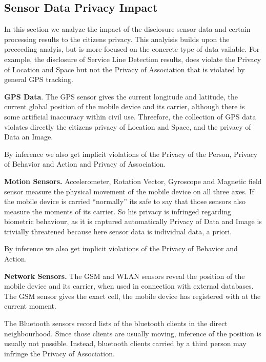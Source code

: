 \subsection{Sensor Data Privacy Impact}\label{sec:SensorPrivacyImpact}



In this section we analyze the impact of the disclosure sensor data and certain processing results to the citizens privacy.
This analyisis builds upon the preceeding analyis, but is more focused on the concrete type of data vailable.
For example, the disclosure of Service Line Detection results, does violate the Privacy of Location and Space but not the Privacy of Association that is violated by general GPS tracking.

\textbf{GPS Data}.
The GPS sensor gives the current longitude and latitude, the current global position of the mobile device and its carrier, although there is some artificial inaccuracy within civil use. Threefore, the collection of GPS data violates directly the citizens privacy of Location and Space, and the privacy of Data an Image.

By inference we also get implicit violations of the Privacy of the Person, Privacy of Behavior and Action and Privacy of Association.

\textbf{Motion Sensors.}
Accelerometer, Rotation Vector, Gyroscope and Magnetic field sensor measure the physical movement of the mobile device on all three axes.
If the mobile device is carried ``normally'' its safe to say that those sensors also measure the moments of its carrier.
So his privacy is infringed regarding biometric behaviour, as it is captured automatically
Privacy of Data and Image is trivially threatened because here sensor data is individual data, a priori.

By inference we also get implicit violations of the Privacy of Behavior and Action.

\textbf{Network Sensors.}
The GSM and WLAN sensors reveal the position of the mobile device and its carrier, when used in connection with external databases.
The GSM sensor gives the exact cell, the mobile device has registered with at the current moment.

The Bluetooth sensors record lists of the bluetooth clients in the direct neighbourhood.
Since those clients are usually moving, inference of the position is usually not possible.
Instead, bluetooth clients carried by a third person may infringe the Privacy of Association.

